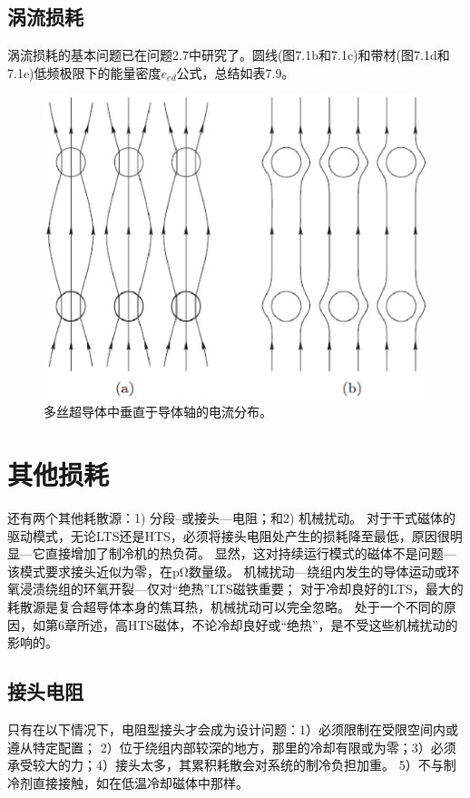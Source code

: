 \subsection{涡流损耗}
涡流损耗的基本问题已在问题2.7中研究了。圆线(图7.1b和7.1c)和带材(图7.1d和7.1e)低频极限下的能量密度$e_{ed}$公式，总结如表7.9。
\begin{figure}[htbp]
	\centering
	\includegraphics[scale=0.6]{chpt7/figs/fig7.6.eps}
	\caption{多丝超导体中垂直于导体轴的电流分布。}
\end{figure}

\section{其他损耗}
还有两个其他耗散源：1) 分段--或接头---电阻；和2) 机械扰动。
对于干式磁体的驱动模式，无论LTS还是HTS，必须将接头电阻处产生的损耗降至最低，原因很明显---它直接增加了制冷机的热负荷。
显然，这对持续运行模式的磁体不是问题---该模式要求接头近似为零，在$\mathrm{p\Omega}$数量级。
机械扰动---绕组内发生的导体运动或环氧浸渍绕组的环氧开裂---仅对“绝热”LTS磁铁重要；
对于冷却良好的LTS，最大的耗散源是复合超导体本身的焦耳热，机械扰动可以完全忽略。
处于一个不同的原因，如第6章所述，高HTS磁体，不论冷却良好或“绝热”，是不受这些机械扰动的影响的。
\subsection{接头电阻}
只有在以下情况下，电阻型接头才会成为设计问题：1）必须限制在受限空间内或遵从特定配置；
2）位于绕组内部较深的地方，那里的冷却有限或为零；3）必须承受较大的力；4）接头太多，其累积耗散会对系统的制冷负担加重。
5）不与制冷剂直接接触，如在低温冷却磁体中那样。

